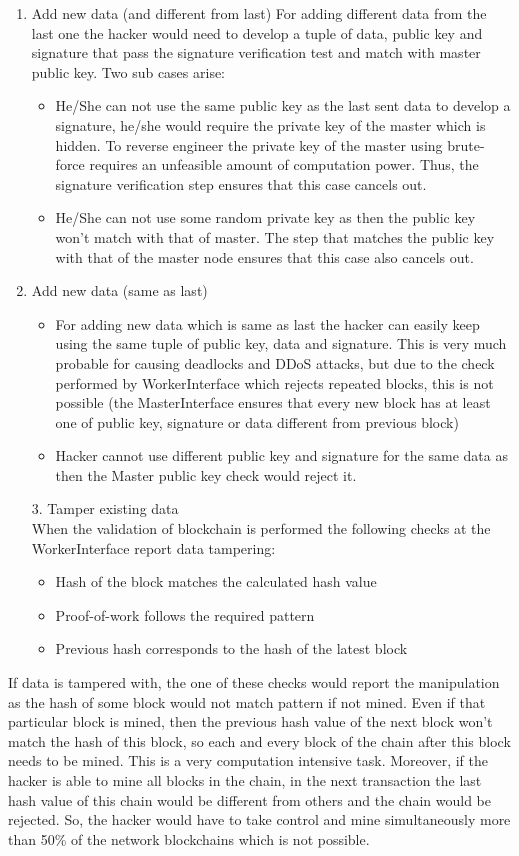 \documentclass[AMA,STIX1COL]{WileyNJD-v2}
\begin{document}
\begin{enumerate}
\item Add new data (and different from last)
For adding different data from the last one the hacker would need to develop a tuple of data, public key and signature that pass the signature verification test and match with master public key. Two sub cases arise:
\begin{itemize}
\item He/She can not use the same public key as the last sent data to develop a signature, he/she would require the private key of the master which is hidden. To reverse engineer the private key of the master using brute-force requires an unfeasible amount of computation power. Thus, the signature verification step ensures that this case cancels out.
\item He/She can not use some random private key as then the public key won’t match with that of master. The step that matches the public key with that of the master node ensures that this case also cancels out. 
\end{itemize}
\item Add new data (same as last)
\begin{itemize}
\item For adding new data which is same as last the hacker can easily keep using the same tuple of public key, data and signature. This is very much probable for causing deadlocks and DDoS attacks, but due to the check performed by WorkerInterface which rejects repeated blocks, this is not possible (the MasterInterface ensures that every new block has at least one of public key, signature or data different from previous block)
\item Hacker cannot use different public key and signature for the same data as then the Master public key check would reject it.
\end{itemize}
3.	Tamper existing data \\
When the validation of blockchain is performed the following checks at the WorkerInterface report data tampering:
\begin{itemize}
\item Hash of the block matches the calculated hash value
\item Proof-of-work follows the required pattern
\item Previous hash corresponds to the hash of the latest block 
\end{itemize}
\end{enumerate}
If data is tampered with, the one of these checks would report the manipulation as the hash of some block would not match pattern if not mined. Even if that particular block is mined, then the previous hash value of the next block won’t match the hash of this block, so each and every block of the chain after this block needs to be mined. This is a very computation intensive task. Moreover, if the hacker is able to mine all blocks in the chain, in the next transaction the last hash value of this chain would be different from others and the chain would be rejected. So, the hacker would have to take control and mine simultaneously more than 50\% of the network blockchains which is not possible.
\end{document}
